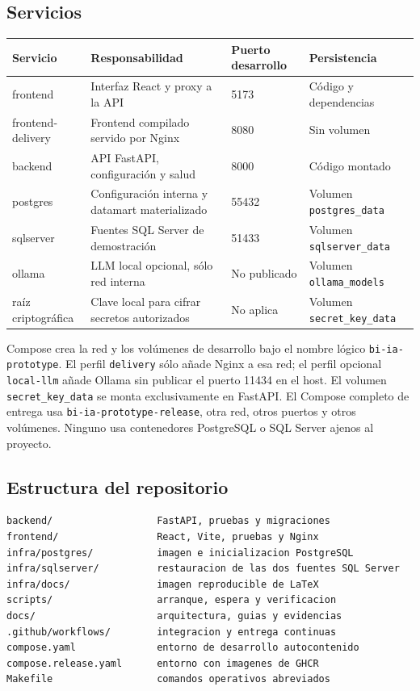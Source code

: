 \documentclass[11pt,letterpaper]{article}
\newcommand{\file}[1]{\texttt{#1}}
\begin{document}
\subsection{Servicios}

\begin{tabularx}{\textwidth}{@{}l X l l@{}}
  \toprule
  Servicio & Responsabilidad & Puerto desarrollo & Persistencia \\
  \midrule
  frontend & Interfaz React y proxy a la API & 5173 & Código y dependencias \\
  frontend-delivery & Frontend compilado servido por Nginx & 8080 & Sin volumen \\
  backend & API FastAPI, configuración y salud & 8000 & Código montado \\
  postgres & Configuración interna y datamart materializado & 55432 & Volumen \file{postgres\_data} \\
  sqlserver & Fuentes SQL Server de demostración & 51433 & Volumen \file{sqlserver\_data} \\
  ollama & LLM local opcional, sólo red interna & No publicado & Volumen \file{ollama\_models} \\
  raíz criptográfica & Clave local para cifrar secretos autorizados & No aplica & Volumen \file{secret\_key\_data} \\
  \bottomrule
\end{tabularx}

Compose crea la red y los volúmenes de desarrollo bajo el nombre lógico \file{bi-ia-prototype}. El perfil \file{delivery} sólo añade Nginx a esa red; el perfil opcional \file{local-llm} añade Ollama sin publicar el puerto 11434 en el host. El volumen \file{secret\_key\_data} se monta exclusivamente en FastAPI. El Compose completo de entrega usa \file{bi-ia-prototype-release}, otra red, otros puertos y otros volúmenes. Ninguno usa contenedores PostgreSQL o SQL Server ajenos al proyecto.

\subsection{Estructura del repositorio}

\begin{lstlisting}[style=terminal]
backend/                  FastAPI, pruebas y migraciones
frontend/                 React, Vite, pruebas y Nginx
infra/postgres/           imagen e inicializacion PostgreSQL
infra/sqlserver/          restauracion de las dos fuentes SQL Server
infra/docs/               imagen reproducible de LaTeX
scripts/                  arranque, espera y verificacion
docs/                     arquitectura, guias y evidencias
.github/workflows/        integracion y entrega continuas
compose.yaml              entorno de desarrollo autocontenido
compose.release.yaml      entorno con imagenes de GHCR
Makefile                  comandos operativos abreviados
\end{lstlisting}
\end{document}
